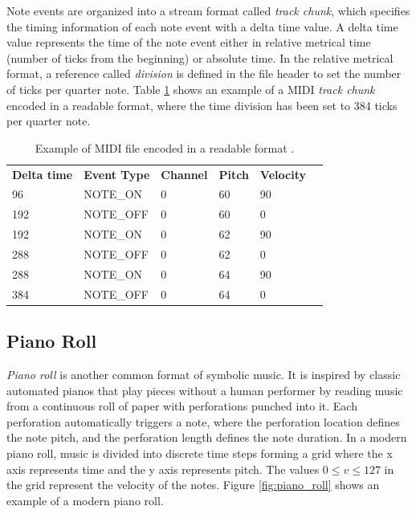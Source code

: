 Note events are organized into a stream format called \textit{track chunk}, which specifies the timing information of each note event with a delta time value. A delta time value represents the time of the note event either in relative metrical time (number of ticks from the beginning) or absolute time. In the relative metrical format, a reference called \textit{division} is defined in the file header to set the number of ticks per quarter note. Table \ref{tab:midi} shows an example of a MIDI \textit{track chunk} encoded in a readable format, where the time division has been set to 384 ticks per quarter note.

\begin{table}[h]
    \centering
    \begin{tabular}{llllll}
        \textbf{Delta time} & \textbf{Event Type} & \textbf{Channel} & \textbf{Pitch} & \textbf{Velocity} \\
        96  & NOTE\_ON  & 0 & 60 & 90 \\
        192 & NOTE\_OFF & 0 & 60 & 0  \\
        192 & NOTE\_ON  & 0 & 62 & 90 \\
        288 & NOTE\_OFF & 0 & 62 & 0  \\
        288 & NOTE\_ON  & 0 & 64 & 90 \\
        384 & NOTE\_OFF & 0 & 64 & 0
    \end{tabular}
    \caption{Example of MIDI file encoded in a readable format \cite{briot2017deep}.}
    \label{tab:midi}
\end{table}


\subsection{Piano Roll}

\textit{Piano roll} is another common format of symbolic music. It is inspired by classic automated pianos that play pieces without a human performer by reading music from a continuous roll of paper with perforations punched into it. Each perforation automatically triggers a note, where the perforation location defines the note pitch, and the perforation length defines the note duration. In a modern piano roll, music is divided into discrete time steps forming a grid where the x axis represents time and the y axis represents pitch. The values $0 \leq v \leq 127$ in the grid represent the velocity of the notes. Figure \ref{fig:piano_roll} shows an example of a modern piano roll.

